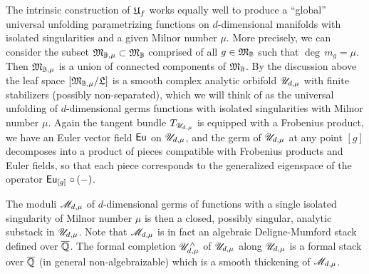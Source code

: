\documentclass[twoside,leqno]{article}
\numberwithin{equation}{section}
\theoremstyle{plain}
\theoremstyle{definition}
\begin{document}
The intrinsic construction of $\mathfrak{U}_{f}$ works equally well to produce a ``global'' universal unfolding parametrizing functions  on $d$-dimensional manifolds with isolated singularities and a given Milnor number $\mu$. More precisely, we can consider the subset  $\mathfrak{M}_{\mathbb{B},\mu} \subset \mathfrak{M}_{\mathbb{B}}$  comprised of all $g \in \mathfrak{M}_{\mathbb{B}}$ such that $\deg \, m_{g} = \mu$. Then $\mathfrak{M}_{\mathbb{B},\mu}$ is a union of connected components of 
$\mathfrak{M}_{\mathbb{B}}$. By the discussion above the leaf space $\left[\mathfrak{M}_{\mathbb{B},\mu}/\mathfrak{L}\right]$ is a smooth complex analytic orbifold $\mathscr{U}_{d,\mu}$ with finite stabilizers (possibly non-separated), which we will think of as the  universal unfolding of $d$-dimensional germs functions with isolated singularities with Milnor number $\mu$. Again the tangent bundle $T_{\mathscr{U}_{d,\mu}}$ is equipped with a Frobenius product, we have an Euler vector field $\operatorname{\mathsf{Eu}}$ on $\mathscr{U}_{d,\mu}$, and the germ of $\mathscr{U}_{d,\mu}$ at any point $[g]$ decomposes into a product of pieces compatible with Frobenius products and Euler fields, so that each piece corresponds to the generalized eigenspace of the 
operator $\operatorname{\mathsf{Eu}}_{[g]}\, \circ \, (-)$.

\medskip

The moduli $\mathscr{M}_{d,\mu}$ of $d$-dimensional  germs of functions  with a single isolated singularity of Milnor number $\mu$ is then a closed, possibly singular, analytic substack in 
$\mathscr{U}_{d,\mu}$. Note that $\mathscr{M}_{d,\mu}$ is in fact an algebraic Deligne-Mumford stack defined over $\overline{\mathbb Q}$. The formal completion $\mathscr{U}_{d,\mu}^{\wedge}$  of 
$\mathscr{U}_{d,\mu}$ along $\mathscr{U}_{d,\mu}$ is a formal stack over $\overline{\mathbb Q}$ (in general non-algebraizable) which is a smooth thickening of $\mathscr{M}_{d,\mu}$.
\end{document}

